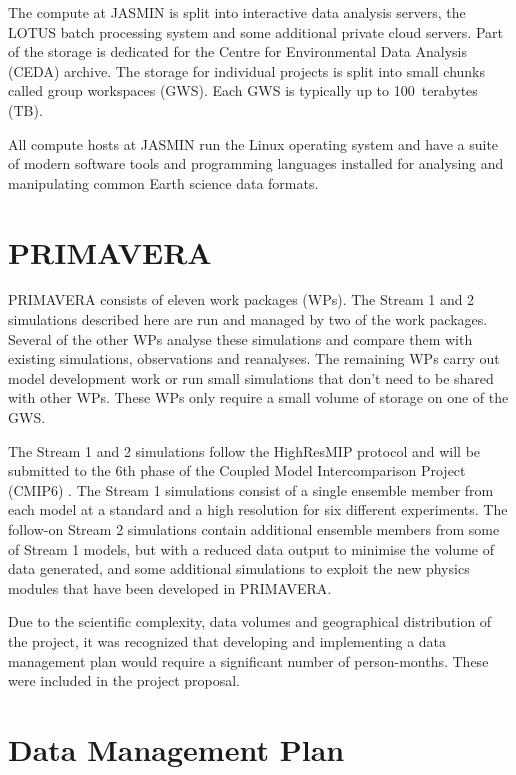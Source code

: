 \documentclass[gmd, manuscript]{copernicus}
\begin{document}
The compute at JASMIN is split into interactive data analysis servers, the LOTUS batch processing system and some additional private cloud servers. Part of the storage is dedicated for the Centre for Environmental Data Analysis (CEDA) archive. The storage for individual projects is split into small chunks called group workspaces (GWS). Each GWS is typically up to 100~terabytes (TB).

All compute hosts at JASMIN run the Linux operating system and have a suite of modern software tools and programming languages installed for analysing and manipulating common Earth science data formats.

\section{PRIMAVERA}

PRIMAVERA consists of eleven work packages (WPs). The Stream 1 and 2 simulations described here are run and managed by two of the work packages. Several of the other WPs analyse these simulations and compare them with existing simulations, observations and reanalyses. The remaining WPs carry out model development work or run small simulations that don't need to be shared with other WPs. These WPs only require a small volume of storage on one of the GWS.

The Stream 1 and 2 simulations follow the HighResMIP protocol and will be submitted to the 6th phase of the Coupled Model Intercomparison Project (CMIP6) \citep{Eyring2016}. The Stream 1 simulations consist of a single ensemble member from each model at a standard and a high resolution for six different experiments. The follow-on Stream 2 simulations contain additional ensemble members from some of Stream 1 models, but with a reduced data output to minimise the volume of data generated, and some additional simulations to exploit the new physics modules that have been developed in PRIMAVERA.

Due to the scientific complexity, data volumes and geographical distribution of the project, it was recognized that developing and implementing a data management plan would require a significant number of person-months. These were included in the project proposal.


\section{Data Management Plan}
\end{document}
